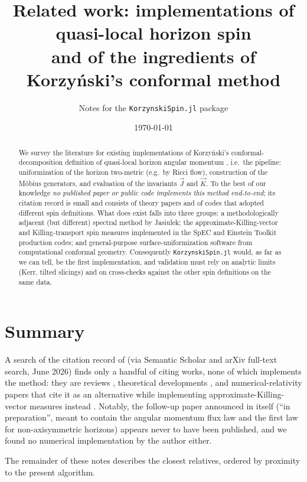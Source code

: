 \documentclass[11pt]{article}
\title{Related work: implementations of quasi-local horizon spin\\
and of the ingredients of Korzy\'nski's conformal method}
\author{Notes for the \texttt{KorzynskiSpin.jl} package}
\date{\today}
\newcommand{\vJ}{\vec{J}}
\newcommand{\vK}{\vec{K}}
\begin{document}
\maketitle

\begin{abstract}
We survey the literature for existing implementations of Korzy\'nski's
conformal-decomposition definition of quasi-local horizon angular momentum
\cite{korzynski2007}, i.e.\ the pipeline: uniformization of the horizon
two-metric (e.g.\ by Ricci flow), construction of the M\"obius generators,
and evaluation of the invariants $\vJ$ and $\vK$.  To the best of our
knowledge \emph{no published paper or public code implements this method
end-to-end}; its citation record is small and consists of theory papers and
of codes that adopted different spin definitions.  What does exist falls into
three groups: a methodologically adjacent (but different) spectral method by
Jasiulek; the approximate-Killing-vector and Killing-transport spin measures
implemented in the SpEC and Einstein Toolkit production codes; and
general-purpose surface-uniformization software from computational conformal
geometry.  Consequently \texttt{KorzynskiSpin.jl} would, as far as we can
tell, be the first implementation, and validation must rely on analytic
limits (Kerr, tilted slicings) and on cross-checks against the other spin
definitions on the same data.
\end{abstract}

\section{Summary}

A search of the citation record of \cite{korzynski2007} (via Semantic
Scholar and arXiv full-text search, June 2026) finds only a handful of
citing works, none of which implements the method: they are reviews
\cite{jaramillo2011,szabados2009}, theoretical developments
\cite{racz2024,ashtekar2022,booth2007}, and numerical-relativity papers that
cite it as an alternative while implementing approximate-Killing-vector
measures instead \cite{owen2017,lovelace2014}.  Notably, the follow-up paper
announced in \cite{korzynski2007} itself (``in preparation'', meant to
contain the angular momentum flux law and the first law for non-axisymmetric
horizons) appears never to have been published, and we found no numerical
implementation by the author either.

The remainder of these notes describes the closest relatives, ordered by
proximity to the present algorithm.
\end{document}

